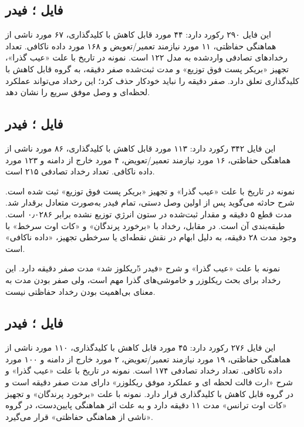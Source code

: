 \documentclass[11pt,a4paper,oneside]{book}
\newcommand{\file}[1]{\lr{\texttt{#1}}}
\newcommand{\code}[1]{\lr{\texttt{#1}}}
\newcommand{\Rrule}[1]{\lr{\texttt{#1}}}
\begin{document}
\subsection{فایل \file{4.xlsx}؛ فیدر \code{F4}}
این فایل ۲۹۰ رکورد دارد: ۴۴ مورد قابل کاهش با کلیدگذاری، ۶۷ مورد ناشی از هماهنگی حفاظتی، ۱۱ مورد نیازمند تعمیر/تعویض و ۱۶۸ مورد داده ناکافی. تعداد رخدادهای تصادفی واردشده به مدل ۱۲۲ است. نمونه  در تاریخ  با علت «عیب گذرا»، تجهیز «بریکر پست فوق توزیع» و مدت ثبت‌شده صفر دقیقه، به گروه قابل کاهش با کلیدگذاری تعلق دارد. صفر دقیقه را نباید خودکار حذف کرد؛ این رخداد می‌تواند عملکرد لحظه‌ای و وصل موفق سریع را نشان دهد.

\subsection{فایل \file{5.xlsx}؛ فیدر \code{F5}}
این فایل ۳۴۲ رکورد دارد: ۱۱۳ مورد قابل کاهش با کلیدگذاری، ۸۶ مورد ناشی از هماهنگی حفاظتی، ۱۶ مورد نیازمند تعمیر/تعویض، ۴ مورد خارج از دامنه و ۱۲۳ مورد داده ناکافی. تعداد رخداد تصادفی ۲۱۵ است.

نمونه  در تاریخ  با علت «عیب گذرا» و تجهیز «بریکر پست فوق توزیع» ثبت شده است. شرح حادثه می‌گوید پس از اولین وصل دستی، تمام فیدر به‌صورت متعادل برقدار شد. مدت قطع ۵ دقیقه و مقدار ثبت‌شده در ستون انرژي توزيع نشده برابر ۰٫۰۲۸۶ است. طبقه‌بندی آن \Rrule{R-SWITCH-01} است. در مقابل، رخداد  با «برخورد پرندگان» و «کات اوت سرخط» با وجود مدت ۲۸ دقیقه، به دلیل ابهام در نقش نقطه‌ای یا سرخطی تجهیز، «داده ناکافی» است.

نمونه  با علت «عیب گذرا» و شرح «فیدر 5ریکلوز شد» مدت صفر دقیقه دارد. این رخداد برای بحث ریکلوزر و خاموشی‌های گذرا مهم است، ولی صفر بودن مدت به معنای بی‌اهمیت بودن رخداد حفاظتی نیست.

\subsection{فایل \file{6.xlsx}؛ فیدر \code{F6}}
این فایل ۲۷۶ رکورد دارد: ۴۵ مورد قابل کاهش با کلیدگذاری، ۱۱۰ مورد ناشی از هماهنگی حفاظتی، ۱۹ مورد نیازمند تعمیر/تعویض، ۲ مورد خارج از دامنه و ۱۰۰ مورد داده ناکافی. تعداد رخداد تصادفی ۱۷۴ است. نمونه  در تاریخ  با علت «عیب گذرا» و شرح «ارت فالت لحظه ای و عملکرد موفق ریکلوزر» دارای مدت صفر دقیقه است و در گروه قابل کاهش با کلیدگذاری قرار دارد. نمونه  با علت «برخورد پرندگان» و تجهیز «کات اوت ترانس» مدت ۱۱ دقیقه دارد و به علت اثر هماهنگی پایین‌دست، در گروه «ناشی از هماهنگی حفاظتی» قرار می‌گیرد.
\end{document}
